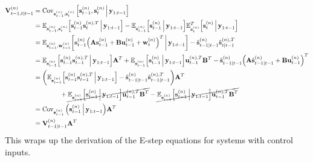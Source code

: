 		\begin{align*}
			\mat{V}_{t - 1, t \subgiven t - 1}^{(n)}
				&= \Cov_{\vec{s}_{t - 1}^{(n)}, \vec{s}_t^{(n)}} \Big[\vec{s}_{t - 1}^{(n)}, \vec{s}_t^{(n)} \Biggiven \vec{y}_{1:t - 1}\Big] \\
				&= \E_{\vec{s}_{t - 1}^{(n)}, \vec{s}_t^{(n)}}\Big[ \vec{s}_{t - 1}^{(n)} \vec{s}_t^{(n), T} \Biggiven \vec{y}_{1:t - 1} \Big] - \E_{\vec{s}_{t - 1}^{(n)}}\Big[\vec{s}_{t - 1}^{(n)} \Biggiven \vec{y}_{1:t - 1}\Big] \E_{\vec{s}_t^{(n)}}^T\Big[ \vec{s}_t^{(n)} \Biggiven \vec{y}_{1:t - 1} \Big] \\
				&= \E_{\vec{s}_{t - 1}^{(n)}, \vec{w}_{t - 1}^{(n)}}\bigg[ \vec{s}_{t - 1}^{(n)} \Big( \mat{A} \vec{s}_{t - 1}^{(n)} + \mat{B} \vec{u}_{t - 1}^{(n)} + \vec{w}_t^{(n)} \Big)^T \bigggiven \vec{y}_{1:t - 1} \bigg] - \hat{\vec{s}}_{t - 1 \subgiven t - 1}^{(n)} \hat{\vec{s}}_{t \subgiven t - 1}^{(n), T} \\
				&= \E_{\vec{s}_{t - 1}^{(n)}}\Big[\vec{s}_{t - 1}^{(n)} \vec{s}_{t - 1}^{(n), T} \Biggiven \vec{y}_{1:t - 1}\Big] \mat{A}^T + \E_{\vec{s}_{t - 1}^{(n)}}\Big[\vec{s}_{t - 1}^{(n)} \Biggiven \vec{y}_{1:t - 1}\Big] \vec{u}_{t - 1}^{(n), T} \mat{B}^T - \hat{\vec{s}}_{t - 1 \subgiven t - 1}^{(n)} \Big( \mat{A} \hat{\vec{s}}_{t - 1 \subgiven t - 1}^{(n)} + \mat{B} \vec{u}_{t - 1}^{(n)} \Big)^T \\
				&= \bigg( \E_{\vec{s}_{t - 1}^{(n)}}\Big[\vec{s}_{t - 1}^{(n)} \vec{s}_{t - 1}^{(n), T} \Biggiven \vec{y}_{1:t - 1}\Big] - \hat{\vec{s}}_{t - 1 \subgiven t - 1}^{(n)} \hat{\vec{s}}_{t - 1 \subgiven t - 1}^{(n), T} \bigg) \mat{A}^T \\
				&\qquad\qquad + \cancel{\E_{\vec{s}_{t - 1}^{(n)}}\Big[\vec{s}_{t - 1}^{(n)} \Biggiven \vec{y}_{1:t - 1}\Big] \vec{u}_{t - 1}^{(n), T} \mat{B}^T} - \cancel{\E_{\vec{s}_{t - 1}^{(n)}}\Big[\vec{s}_{t - 1}^{(n)} \Biggiven \vec{y}_{1:t - 1}\Big] \vec{u}_{t - 1}^{(n), T} \mat{B}^T} \\
				&= \Cov_{\vec{s}_{t - 1}^{(n)}}\Big( \vec{s}_{t - 1}^{(n)} \Biggiven \vec{y}_{1:t - 1} \Big) \mat{A}^T \\
				&= \mat{V}_{t - 1 \subgiven t - 1}^{(n)} \mat{A}^T
		\end{align*}
		This wraps up the derivation of the E-step equations for systems with control inputs.















